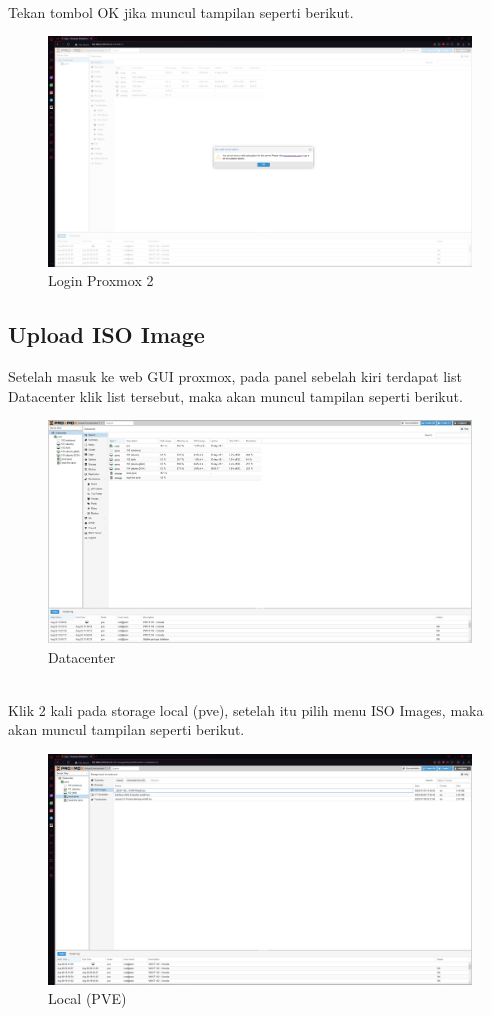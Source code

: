 \documentclass{article}
\begin{document}
  \\ Tekan tombol OK jika muncul tampilan seperti berikut.
  \begin{figure}[h!]
    \centering
    \includegraphics[width=0.7\linewidth]{login proxmox 2.png}
    \caption{Login Proxmox 2}
  \end{figure}
  \newpage
  
  \subsection{Upload ISO Image}
  Setelah masuk ke web GUI proxmox, pada panel sebelah kiri terdapat list Datacenter klik list tersebut,
  maka akan muncul tampilan seperti berikut.
  \begin{figure}[h!]
    \centering
    \includegraphics[width=0.7\linewidth]{datacenter.png}
    \caption{Datacenter}
  \end{figure}
  \\ Klik 2 kali pada storage local (pve), setelah itu pilih menu ISO Images, maka akan muncul tampilan seperti berikut.
  \begin{figure}[h!]
    \centering
    \includegraphics[width=0.7\linewidth]{upload iso 1.png}
    \caption{Local (PVE)}
  \end{figure}
  \newpage
\end{document}
